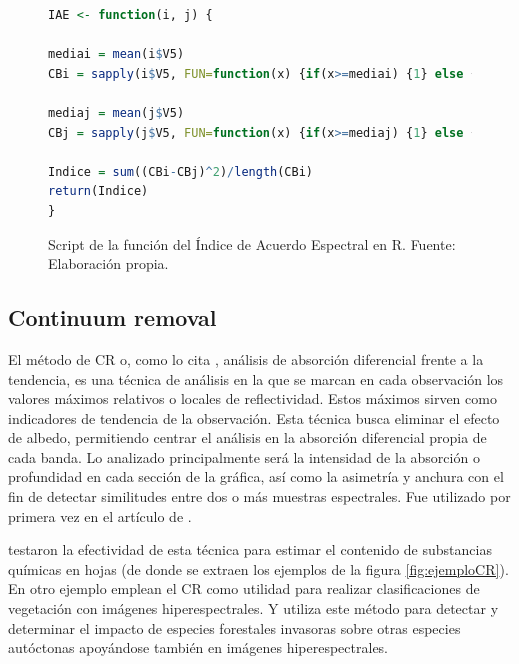\begin{figure}
\centering
\begin{lstlisting}[language = R, frame = single]
IAE <- function(i, j) {
  
mediai = mean(i$V5)
CBi = sapply(i$V5, FUN=function(x) {if(x>=mediai) {1} else {0}})
  
mediaj = mean(j$V5)
CBj = sapply(j$V5, FUN=function(x) {if(x>=mediaj) {1} else {0}})
  	
Indice = sum((CBi-CBj)^2)/length(CBi)
return(Indice)  
}
\end{lstlisting}
\caption[Función de Índice de Acuerdo Espectral]{Script de la función del Índice de Acuerdo Espectral en R. Fuente: Elaboración propia.}
\label{fig:IAE}
\end{figure}

\subsection{Continuum removal}
\label{subsec:Continuum_removal}

El método de \ac{CR} o, como lo cita \cite{chuvieco2002teledeteccion}, análisis de absorción diferencial frente a la tendencia, es una técnica de análisis en la que se marcan en cada observación los valores máximos relativos o locales de reflectividad. Estos máximos sirven como indicadores de tendencia de la observación. Esta técnica busca eliminar el efecto de albedo, permitiendo centrar el análisis en la absorción diferencial propia de cada banda. Lo analizado principalmente será la intensidad de la absorción o profundidad en cada sección de la gráfica, así como la asimetría y anchura con el fin de detectar similitudes entre dos o más muestras espectrales. Fue utilizado por primera vez en el artículo de \cite{kokaly1999spectroscopic}.\Sep

\cite{huang2004estimating} testaron la efectividad de esta técnica para estimar el contenido de substancias químicas en hojas (de donde se extraen los ejemplos de la figura \ref{fig:ejemploCR}). En otro ejemplo \cite{filippi2007effect} emplean el \ac{CR} como utilidad para realizar clasificaciones de vegetación con imágenes hiperespectrales. Y \cite{underwood2003mapping} utiliza este método para detectar y determinar el impacto de especies forestales invasoras sobre otras especies autóctonas apoyándose también en imágenes hiperespectrales.\Sep

